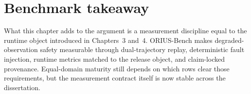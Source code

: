 \section{Benchmark takeaway}
What this chapter adds to the argument is a measurement discipline equal to the runtime
object introduced in Chapters~3 and~4. ORIUS-Bench makes degraded-observation safety
measurable through dual-trajectory replay, deterministic fault injection, runtime metrics
matched to the release object, and claim-locked provenance. Equal-domain maturity still
depends on which rows clear those requirements, but the measurement contract itself is now
stable across the dissertation.

